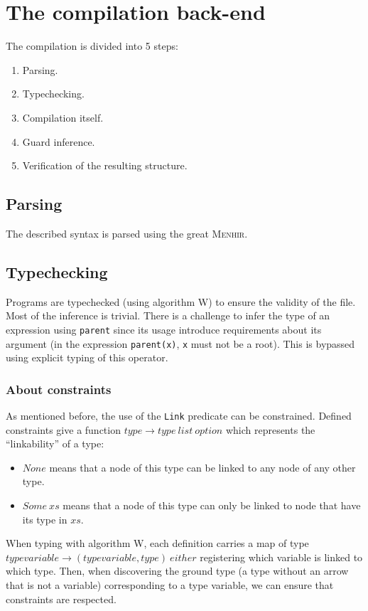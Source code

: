 \documentclass[10pt,a4paper]{article}
\newcommand\Menhir{\textsc{Menhir}}
\newcommand{\ocaml}{\texttt}
\begin{document}
\section{The compilation back-end}
The compilation is divided into 5 steps:
\begin{enumerate}
\item Parsing.
\item Typechecking.
\item Compilation itself.
\item Guard inference.
\item Verification of the resulting structure.
\end{enumerate}

\subsection{Parsing}
The described syntax is parsed using the great \Menhir{}\cite{menhir}.

\subsection{Typechecking}
Programs are typechecked (using algorithm W) to ensure the validity of the file. Most of the inference is trivial. There is a challenge to infer the type of an expression using \ocaml{parent} since its usage introduce requirements about its argument (in the expression \ocaml{parent(x)}, \ocaml{x} must not be a root). This is bypassed using explicit typing of this operator.\\

\subsubsection{About constraints}
As mentioned before, the use of the \ocaml{Link} predicate can be constrained. Defined constraints give a function $type \to type\ list\ option$ which represents the ``linkability'' of a type:
\begin{itemize}
\item $None$ means that a node of this type can be linked to any node of any other type.
\item $Some\ xs$ means that a node of this type can only be linked to node that have its type in $xs$.
\end{itemize}
When typing with algorithm W, each definition carries a map of type $typevariable \to (typevariable, type)\ either$ registering which variable is linked to which type. Then, when discovering the ground type (a type without an arrow that is not a variable) corresponding to a type variable, we can ensure that constraints are respected.
\end{document}
